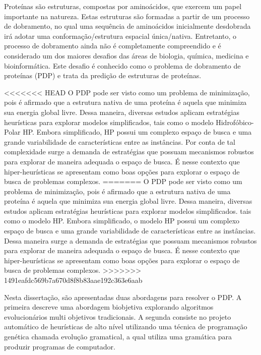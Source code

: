 \begin{resumo}


Proteínas são estruturas, compostas por aminoácidos, que exercem um papel importante na natureza. Estas estruturas são formadas a partir de um processo de dobramento, no qual uma sequência de aminoácidos inicialmente desdobrada irá adotar uma conformação/estrutura espacial única/nativa. Entretanto, o processo de dobramento ainda não é completamente compreendido e é considerado um dos maiores desafios das áreas de biologia, química, medicina e bioinformática. Este desafio é conhecido como o problema de dobramento de proteínas (PDP) e trata da predição de estruturas de proteínas. 

<<<<<<< HEAD
O PDP pode ser visto como um problema de minimização, pois é afirmado que a estrutura nativa de uma proteína é aquela que minimiza sua energia global livre. Dessa maneira, diversas estudos aplicam estratégias heurísticas para explorar modelos simplificados, tais como o modelo Hidrofóbico-Polar HP. Embora simplificado,  HP possui um complexo espaço de busca e uma grande variabilidade de características entre as instâncias. Por conta de tal complexidade surge a demanda de estratégias que possuam mecanismos robustos para explorar de maneira adequada o espaço de busca. É nesse contexto que hiper-heurísticas se apresentam como boas opções para explorar o espaço de busca de problemas complexos. 
=======
O PDP pode ser visto como um problema de minimização, pois é afirmado que a estrutura nativa de uma proteína é aquela que minimiza sua energia global livre. Dessa maneira, diversas estudos aplicam estratégias heurísticas para explorar modelos simplificados. tais como o modelo HP. Embora simplificado, o modelo HP possui um complexo espaço de busca e uma grande variabilidade de características entre as instâncias. Dessa maneira surge a demanda de estratégias que possuam mecanismos robustos para explorar de maneira adequada o espaço de busca. É nesse contexto que hiper-heurísticas se apresentam como boas opções para explorar o espaço de busca de problemas complexos. 
>>>>>>> 1491eafdc569b7a670d8f8b83aae192c363e6aab



Nesta dissertação, são apresentadas duas abordagens para resolver o PDP. A primeira descreve uma abordagem biobjetiva explorando  algoritmos evolucionários multi objetivos tradicionais. A segunda consiste no projeto automático de heurísticas de alto nível utilizando uma técnica de programação genética chamada evolução gramatical, a qual utiliza uma gramática para produzir programas de computador. 


\end{resumo}
